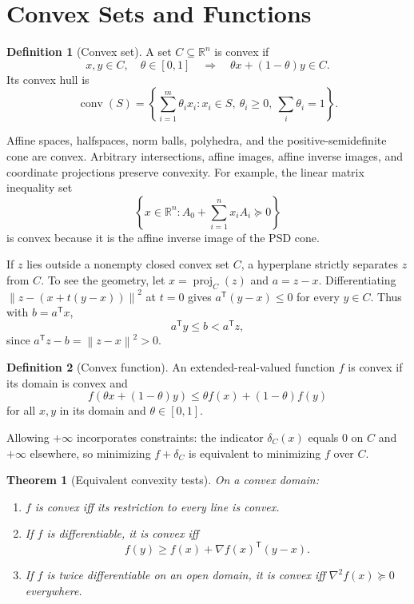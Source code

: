 \documentclass[12pt,oneside]{book}
\numberwithin{equation}{section}
\theoremstyle{definition}
\newtheorem{definition}{Definition}[section]
\theoremstyle{plain}
\newtheorem{theorem}{Theorem}[section]
\theoremstyle{remark}
\newcommand{\R}{\mathbb{R}}
\newcommand{\norm}[1]{\left\lVert #1 \right\rVert}
\newcommand{\grad}{\nabla}
\newcommand{\Hess}{\nabla^2}
\begin{document}
\section{Convex Sets and Functions}

\begin{definition}[Convex set]
A set $C\subseteq\R^n$ is convex if
\[
 x,y\in C,\quad\theta\in[0,1]
 \quad\Longrightarrow\quad
 \theta x+(1-\theta)y\in C.
\]
Its convex hull is
\[
 \operatorname{conv}(S)
 =\left\{\sum_{i=1}^m\theta_ix_i:
 x_i\in S,\ \theta_i\geq0,\ \sum_i\theta_i=1\right\}.
\]
\end{definition}

Affine spaces, halfspaces, norm balls, polyhedra, and the positive-semidefinite
cone are convex. Arbitrary intersections, affine images, affine inverse
images, and coordinate projections preserve convexity. For example, the
linear matrix inequality set
\[
 \left\{x\in\R^n:A_0+\sum_{i=1}^nx_iA_i\succeq0\right\}
\]
is convex because it is the affine inverse image of the PSD cone.

If $z$ lies outside a nonempty closed convex set $C$, a hyperplane strictly
separates $z$ from $C$. To see the geometry, let $x=\operatorname{proj}_C(z)$
and $a=z-x$. Differentiating
$\norm{z-(x+t(y-x))}^2$ at $t=0$ gives
$a^\mathsf T(y-x)\leq0$ for every $y\in C$. Thus with $b=a^\mathsf Tx$,
\[
 a^\mathsf Ty\leq b<a^\mathsf Tz,
\]
since $a^\mathsf Tz-b=\norm{z-x}^2>0$.

\begin{definition}[Convex function]
An extended-real-valued function $f$ is convex if its domain is convex and
\[
 f(\theta x+(1-\theta)y)
 \leq\theta f(x)+(1-\theta)f(y)
\]
for all $x,y$ in its domain and $\theta\in[0,1]$.
\end{definition}

Allowing $+\infty$ incorporates constraints: the indicator
$\delta_C(x)$ equals $0$ on $C$ and $+\infty$ elsewhere, so minimizing
$f+\delta_C$ is equivalent to minimizing $f$ over $C$.

\begin{theorem}[Equivalent convexity tests]
On a convex domain:
\begin{enumerate}
 \item $f$ is convex iff its restriction to every line is convex.
 \item If $f$ is differentiable, it is convex iff
 \begin{equation}
  f(y)\geq f(x)+\grad f(x)^\mathsf T(y-x).
  \label{eq:convex-first-order}
 \end{equation}
 \item If $f$ is twice differentiable on an open domain, it is convex iff
 $\Hess f(x)\succeq0$ everywhere.
\end{enumerate}
\end{theorem}
\end{document}
